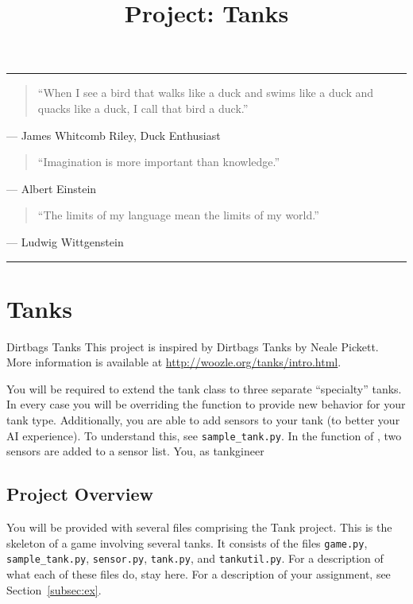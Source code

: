 \documentclass[11pt]{cselabheader}
\title{Project: Tanks}
\begin{document}
\maketitle

\hrule

\begin{quotation}
  ``When I see a bird that walks like a duck and swims like a duck and quacks like
  a duck, I call that bird a duck.''
\end{quotation}
\begin{flushright}
  --- James Whitcomb Riley, Duck Enthusiast
\end{flushright}

\begin{quotation}
``Imagination is more important than knowledge.''
\end{quotation}
\begin{flushright}
  --- Albert Einstein
\end{flushright}

\begin{quotation}
``The limits of my language mean the limits of my world.''
\end{quotation}
\begin{flushright}
  --- Ludwig Wittgenstein
\end{flushright}

\hrule


\section{Tanks}

\begin{warningbox}{Dirtbags Tanks}
  This project is inspired by Dirtbags Tanks by Neale Pickett.
  More information is available at \url{http://woozle.org/tanks/intro.html}.
\end{warningbox}

You will be required to extend the tank class to three separate
``specialty'' tanks. In every case you will be overriding the
 function to provide new behavior for your tank
type. Additionally, you are able to add sensors to your tank (to
better your AI experience). To understand this, see
\texttt{sample_tank.py}. In the  function of
, two sensors are added to a sensor list. You, as
tankgineer


\subsection{Project Overview}
You will be provided with several files comprising the Tank project. This is the
skeleton of a game involving several tanks. It consists of the files
\texttt{game.py}, \texttt{sample\_tank.py}, \texttt{sensor.py},
\texttt{tank.py}, and \texttt{tankutil.py}. For a description of what each of
these files do, stay here. For a description of your assignment, see
Section~\ref{subsec:ex}.
\end{document}
